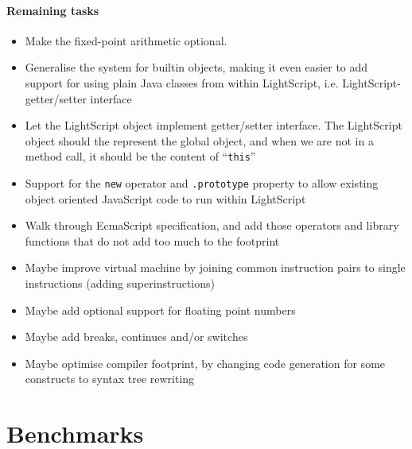 \documentclass[11pt]{report}
\begin{document}
\subsubsection{Remaining tasks}
\begin{itemize}
\item Make the fixed-point arithmetic optional.
\item Generalise the system for builtin objects, making it even easier to add support for using plain Java classes from within LightScript, i.e. LightScript-getter/setter interface
\item Let the LightScript object implement getter/setter interface. The LightScript object should the represent the global object, and when we are not in a method call, it should be the content of ``\verb|this|''
\item Support for the \verb|new| operator and \verb|.prototype| property to allow existing object oriented JavaScript code to run within LightScript
\item Walk through EcmaScript specification, and add those operators and library functions that do not add too much to the footprint
\item Maybe improve virtual machine by joining common instruction pairs to single instructions (adding superinstructions)
\item Maybe add optional support for floating point numbers
\item Maybe add breaks, continues and/or switches
\item Maybe optimise compiler footprint, by changing code generation for some constructs to syntax tree rewriting
\end{itemize}

\chapter{Benchmarks}
\label{benchmark}
\end{document}
